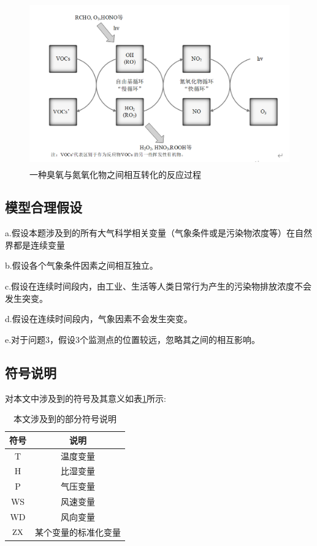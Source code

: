 \documentclass[bwprint]{gmcmthesis}
\numberwithin{figure}{section}
\newcommand{\upcite}[1]{\textsuperscript{\textsuperscript{\cite{#1}}}}
\begin{document}
\begin{figure}[!h]
	\centering
	\includegraphics[width=.7\textwidth]{figures//fig2-1.png}
	\caption{一种臭氧与氮氧化物之间相互转化的反应过程\upcite{ref5}}
	\label{fig2-1}
\end{figure}

\subsection{模型合理假设}
a.假设本题涉及到的所有大气科学相关变量（气象条件或是污染物浓度等）在自然界都是连续变量

b.假设各个气象条件因素之间相互独立。

c.假设在连续时间段内，由工业、生活等人类日常行为产生的污染物排放浓度不会发生突变。

d.假设在连续时间段内，气象因素不会发生突变。

e.对于问题3，假设3个监测点的位置较远，忽略其之间的相互影响。

\subsection{符号说明}
对本文中涉及到的符号及其意义如表\ref{tab:table2-1}所示:
\begin{table}[h!]
	\caption{本文涉及到的部分符号说明}\label{tab:table2-1}
	\begin{center}
		\begin{tabular}{|c|c|}
			\hline
			符号&说明\\
			\hline
			T&温度变量\\
			H&比湿变量\\
			P&气压变量\\
			WS&风速变量\\
			WD&风向变量\\
			$\rm ZX$&某个变量的标准化变量\\
			\hline
		\end{tabular}
	\end{center}
\end{table}
\end{document}

